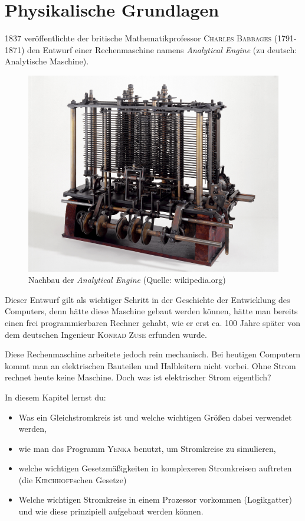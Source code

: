 \chapter{Physikalische Grundlagen}

1837 veröffentlichte der britische Mathematikprofessor \textsc{Charles Babbages} (1791-1871) den Entwurf einer Rechenmaschine namens \emph{Analytical Engine} (zu deutsch: Analytische Maschine).

\begin{figure}[htp]
\begin{center}%
\includegraphics[scale=1.1]{pics/analyticengine}
\caption{Nachbau der \emph{Analytical Engine} (Quelle: wikipedia.org)}
\end{center}
\end{figure}


Dieser Entwurf gilt als wichtiger Schritt in der Geschichte der Entwicklung des Computers, denn hätte diese Maschine gebaut werden können, hätte man bereits einen frei programmierbaren Rechner gehabt, wie er erst ca. 100 Jahre später von dem deutschen Ingenieur \textsc{Konrad Zuse} erfunden wurde.

Diese Rechenmaschine arbeitete jedoch rein mechanisch.
Bei heutigen Computern kommt man an elektrischen Bauteilen und Halbleitern nicht vorbei.
Ohne Strom rechnet heute keine Maschine.
Doch was ist elektrischer Strom eigentlich?


\begin{Ziele}

In diesem Kapitel lernst du:

\begin{itemize}
\item Was ein Gleichstromkreis ist und welche wichtigen Größen dabei verwendet werden,
\item wie man das Programm \textsc{Yenka} benutzt, um Stromkreise zu simulieren,
\item welche wichtigen Gesetzmäßigkeiten in komplexeren Stromkreisen auftreten (die \textsc{Kirchhoff}schen Gesetze)
\item Welche wichtigen Stromkreise in einem Prozessor vorkommen (Logikgatter) und wie diese prinzipiell aufgebaut werden können.
\end{itemize}
\end{Ziele}


